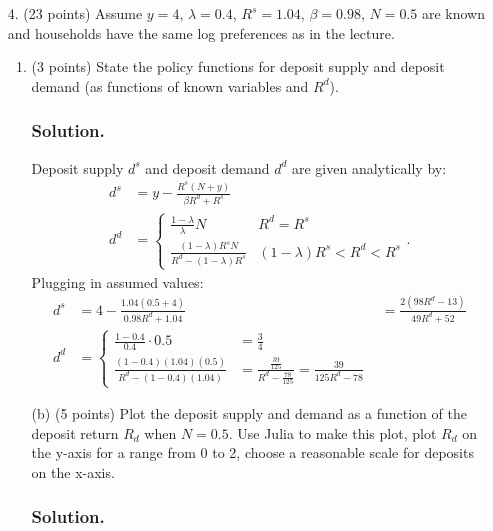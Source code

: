 \documentclass[12pt]{article}
\begin{document}
\begin{enumerate}
\begin{enumerate}
    
     
    \end{enumerate}
    \item[4.] (23 points) Assume $y = 4$, $\lambda = 0.4$, $R^s = 1.04$, $\beta = 0.98$, $N = 0.5$ are known and households have the same log preferences as in the lecture.
    
    \begin{enumerate}
        \item (3 points) State the policy functions for deposit supply and deposit demand (as functions of known variables and $R^d$).        
        \subsubsection*{Solution.}
        
        Deposit supply $d^s$ and deposit demand $d^d$ are given analytically by:
        \begin{align*}
            d^s &= y - \frac{R^s(N+y)}{\beta R^d + R^s}
            \\ d^d &= \begin{cases}
                \frac{1-\lambda}{\lambda}N &R^d = R^s
                \\ \frac{(1-\lambda)R^sN}{R^d - (1-\lambda)R^s} & (1-\lambda)R^s < R^d < R^s
            \end{cases}.
        \end{align*}
        Plugging in assumed values: 
        \begin{align*}
            d^s &= 4 - \frac{1.04(0.5+4)}{0.98 R^d + 1.04} &= \frac{2 (98 R^d - 13)}{49 R^d + 52}
            \\ d^d &= \begin{cases}
                \frac{1-0.4}{0.4}\cdot0.5 & =\frac{3 }{4}
                \\ \frac{(1-0.4)(1.04)(0.5)}{R^d - (1-0.4)(1.04)} & =\frac{\frac{39}{125}}{R^d - \frac{78}{125}} = \frac{39}{125R^{d}-78} %
            \end{cases}%
        \end{align*}
        
        \item[(b)] {(5 points)} Plot the deposit supply and demand as a function of the deposit return $R_d$ when $N = 0.5$. Use Julia to make this plot, plot $R_d$ on the y-axis for a range from 0 to 2, choose a reasonable scale for deposits on the x-axis.
        \subsubsection*{Solution.}


\end{enumerate}
\end{enumerate}
\end{document}
